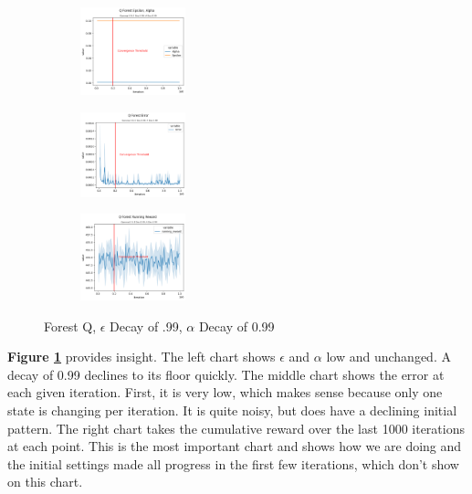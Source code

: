 \documentclass[letterpaper]{article} %
\begin{document}
\begin{figure}[!htb]
	\centering
 	\begin{subfigure}[b]{0.175\textwidth}
		\includegraphics[width=1.2in]{Figures/Q_Forest_Epsilon__Alpha_Gamma_0_9__E_Dec_0_99__A_Dec_0_99.png}
  	\end{subfigure}%
	 \begin{subfigure}[b]{0.175\textwidth}
		\includegraphics[width=1.2in]{Figures/Q_Forest_Error_Gamma_0_9__E_Dec_0_99__A_Dec_0_99.png}
  	\end{subfigure}%
	\begin{subfigure}[b]{0.175\textwidth}
		\includegraphics[width=1.2in]{Figures/Q_Forest_Running_Reward_Gamma_0_9__E_Dec_0_99__A_Dec_0_99.png}
  	\end{subfigure}
\caption{Forest Q,  $\epsilon$ Decay of .99, $\alpha$ Decay of 0.99}
\label{fig:forest_q_e_99_a_99_rewards}
\end{figure}

\textbf{Figure \ref{fig:forest_q_e_99_a_99_rewards}} provides insight.  The left chart shows $\epsilon$ and $\alpha$ low and unchanged.  A decay of 0.99 declines to its floor quickly.  The middle chart shows the error at each given iteration.  First, it is very low, which makes sense because only one state is changing per iteration.  It is quite noisy, but does have a declining initial pattern.  The right chart  takes the cumulative reward over the last 1000 iterations at each point.  This is the most important chart and shows how we are doing and the initial settings made all progress in the first few iterations, which don't show on this chart.
\end{document}
